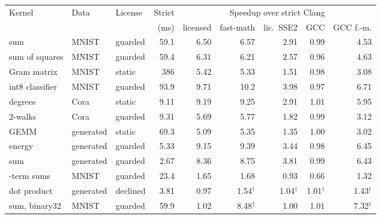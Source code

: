 \begin{tabular}{lllrrrrrr}
\toprule
Kernel & Data & License & Strict & \multicolumn{5}{c}{Speedup over strict Clang}\\
\cmidrule(lr){5-9}
 & & & (ms) & licensed & fast-math & lic.\ SSE2 & GCC & GCC f.-m.\\
\midrule
sum & MNIST & guarded & 59.1 & 6.50 & 6.57 & 2.91 & 0.99 & 4.53\\
sum of squares & MNIST & guarded & 59.4 & 6.31 & 6.21 & 2.57 & 0.96 & 4.63\\
Gram matrix & MNIST & static & 386 & 5.42 & 5.33 & 1.51 & 0.98 & 3.08\\
int8 classifier & MNIST & guarded & 93.9 & 9.71 & 10.2 & 3.98 & 0.97 & 6.71\\
degrees & Cora & static & 9.11 & 9.19 & 9.25 & 2.91 & 1.01 & 5.95\\
2-walks & Cora & guarded & 9.31 & 5.69 & 5.77 & 1.82 & 0.99 & 3.12\\
GEMM & generated & static & 69.3 & 5.09 & 5.35 & 1.35 & 1.00 & 3.02\\
energy & generated & guarded & 5.33 & 9.15 & 9.39 & 3.44 & 0.98 & 6.45\\
sum & generated & guarded & 2.67 & 8.36 & 8.75 & 3.81 & 0.99 & 6.43\\
\addlinespace
16-term sums & MNIST & guarded & 23.4 & 1.65 & 1.68 & 0.93 & 0.66 & 1.32\\
\midrule
dot product & generated & declined & 3.81 & 0.97 & 1.54$^\dagger$ & 1.04$^\dagger$ & 1.01$^\dagger$ & 1.43$^\dagger$\\
sum, binary32 & MNIST & guarded & 59.9 & 1.02 & 8.48$^\dagger$ & 1.00 & 1.01 & 7.32$^\dagger$\\
\bottomrule
\end{tabular}
